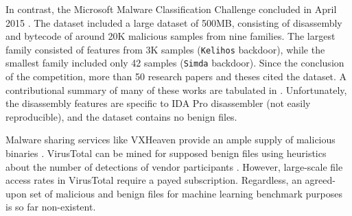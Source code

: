 In contrast, the Microsoft Malware Classification Challenge concluded in April 2015 \cite{ronen2018microsoft}.  The dataset included a large dataset of 500MB, consisting of disassembly and bytecode of around 20K malicious samples from nine families.   The largest family consisted of features from 3K samples (\texttt{Kelihos} backdoor), while the smallest family included only 42 samples (\texttt{Simda} backdoor).  Since the conclusion of the competition, more than 50 research papers and theses cited the dataset.  A contributional summary of many of these works are tabulated in \cite{ronen2018microsoft}.  Unfortunately, the disassembly features are specific to IDA Pro disassembler (not easily reproducible), and the dataset contains no benign files.

Malware sharing services like VXHeaven provide an ample supply of malicious binaries \cite{vxheaven}.  VirusTotal can be mined for supposed benign files using heuristics about the number of detections of vendor participants \cite{virustotal}.  However, large-scale file access rates in VirusTotal require a payed subscription.  Regardless, an agreed-upon set of malicious and benign files for machine learning benchmark purposes is so far non-existent.
